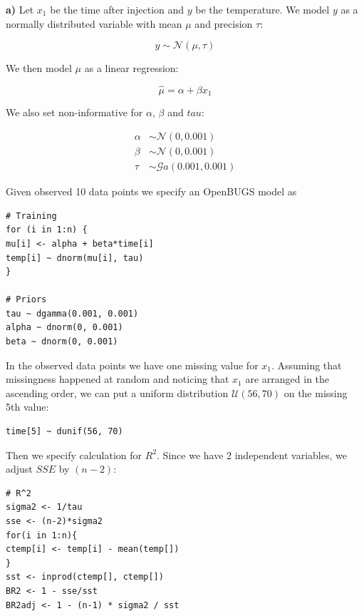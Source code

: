 \documentclass[a4 paper]{article}
\begin{document}
	




\textbf{a)} Let $x_1$ be the time after injection
and $y$ be the temperature. We model $y$ as
a normally distributed variable with 
mean $\mu$ and precision $\tau$:

$$
y \sim \mathcal{N}\left(\mu,\tau\right)
$$

We then model $\mu$ as a linear regression:

$$
\hat{\mu}=\alpha+\beta x_{1}
$$

We also set non-informative for 
$\alpha$, $\beta$ and $tau$:

\begin{align*}
\alpha&\sim\mathcal{N}\left(0,0.001\right)\\\beta&\sim\mathcal{N}\left(0,0.001\right)\\\tau&\sim\mathcal{G}a\left(0.001,0.001\right)
\end{align*}


Given observed 10 data points we 
specify an OpenBUGS model as

\begin{Verbatim}
# Training
for (i in 1:n) {
mu[i] <- alpha + beta*time[i]
temp[i] ~ dnorm(mu[i], tau)	
}

# Priors
tau ~ dgamma(0.001, 0.001)
alpha ~ dnorm(0, 0.001)
beta ~ dnorm(0, 0.001)
\end{Verbatim} 

In the observed data points we have one 
missing value for $x_1$. Assuming that 
missingness happened at random and 
noticing that $x_1$ are arranged 
in the ascending order, we can 
put a uniform distribution $\mathcal{U}(56,70)$
on the missing 5th value:

\begin{Verbatim}
time[5] ~ dunif(56, 70)
\end{Verbatim} 


Then we specify calculation for $R^2$.
Since we have 2 independent variables, 
we adjust $SSE$ by $(n-2)$:

\begin{Verbatim}
# R^2
sigma2 <- 1/tau
sse <- (n-2)*sigma2
for(i in 1:n){
ctemp[i] <- temp[i] - mean(temp[])
}
sst <- inprod(ctemp[], ctemp[]) 
BR2 <- 1 - sse/sst
BR2adj <- 1 - (n-1) * sigma2 / sst
\end{Verbatim} 
\end{document}
